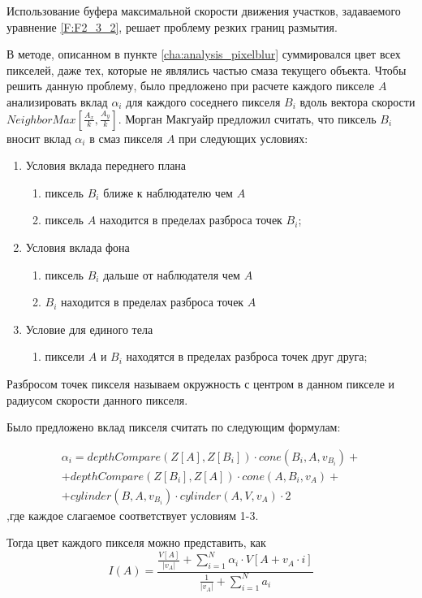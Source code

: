 Использование буфера максимальной скорости движения участков, задаваемого уравнение \eqref{F:F2_3_2}, решает проблему резких границ размытия.
\par
В методе, описанном в пункте \ref{cha:analysis_pixelblur} суммировался цвет всех пикселей, даже тех, которые не являлись частью смаза текущего объекта. Чтобы решить данную проблему, было предложено при расчете каждого пикселе $A$ анализировать вклад $\alpha_i$ для каждого соседнего пикселя $B_i$ вдоль  вектора скорости $NeighborMax[\frac{A_x}{k}, \frac{A_y}{k}]$. Морган Макгуайр предложил считать, что пиксель $B_i$ вносит вклад $\alpha_i$ в смаз пикселя $A$ при следующих условиях:
\begin{enumerate}
    \item Условия вклада переднего плана
          \begin{enumerate}
              \item пиксель $B_i$ ближе к наблюдателю чем $A$
              \item пиксель $A$ находится в пределах разброса точек $B_i$;
          \end{enumerate}
    \item Условия вклада фона
          \begin{enumerate}
              \item пиксель $B_i$ дальше от наблюдателя чем $A$
              \item $B_i$ находится в пределах разброса точек $A$
          \end{enumerate}
    \item Условие для единого тела
          \begin{enumerate}
              \item пиксели $A$ и $B_i$ находятся в пределах разброса точек друг друга;
          \end{enumerate}

\end{enumerate}


Разбросом точек пикселя называем окружность с центром в данном пикселе и радиусом скорости данного пикселя.
\par
Было предложено вклад пикселя считать по следующим формулам:
\begin{eqndesc}
    \begin{eqnarray}
        \alpha_i =
        depthCompare(Z[A], Z[B_i]) \cdot cone(B_i, A, v_{B_i}) + \\
        + depthCompare(Z[B_i], Z[A]) \cdot cone(A, B_i, v_A) + \\
        + cylinder(B,A,v_{B_i}) \cdot cylinder(A,V, v_A) \cdot 2
    \end{eqnarray}
    ,где каждое слагаемое соответствует условиям 1-3.
\end{eqndesc}
\par Тогда цвет каждого пикселя можно представить, как
\begin{equation}
    I(A) = \frac{\frac{V[A]}{|v_A|} +
    \sum_{i=1}^N
    {\alpha_i \cdot V[A + v_A \cdot i]}
    }{\frac{1}{|v_A|} + \sum_{i=1}^N  a_i}
\end{equation}

